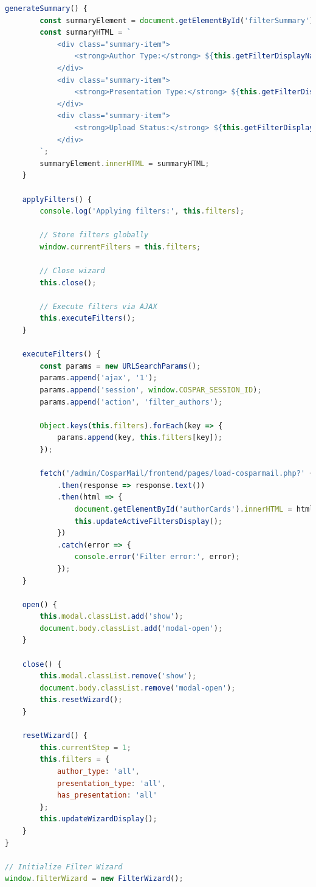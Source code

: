 \documentclass[11pt,a4paper]{article}
\begin{document}
\begin{lstlisting}[language=JavaScript, caption=Filter-Wizard Implementation]
    generateSummary() {
        const summaryElement = document.getElementById('filterSummary');
        const summaryHTML = `
            <div class="summary-item">
                <strong>Author Type:</strong> ${this.getFilterDisplayName('author_type', this.filters.author_type)}
            </div>
            <div class="summary-item">
                <strong>Presentation Type:</strong> ${this.getFilterDisplayName('presentation_type', this.filters.presentation_type)}
            </div>
            <div class="summary-item">
                <strong>Upload Status:</strong> ${this.getFilterDisplayName('has_presentation', this.filters.has_presentation)}
            </div>
        `;
        summaryElement.innerHTML = summaryHTML;
    }
    
    applyFilters() {
        console.log('Applying filters:', this.filters);
        
        // Store filters globally
        window.currentFilters = this.filters;
        
        // Close wizard
        this.close();
        
        // Execute filters via AJAX
        this.executeFilters();
    }
    
    executeFilters() {
        const params = new URLSearchParams();
        params.append('ajax', '1');
        params.append('session', window.COSPAR_SESSION_ID);
        params.append('action', 'filter_authors');
        
        Object.keys(this.filters).forEach(key => {
            params.append(key, this.filters[key]);
        });
        
        fetch('/admin/CosparMail/frontend/pages/load-cosparmail.php?' + params.toString())
            .then(response => response.text())
            .then(html => {
                document.getElementById('authorCards').innerHTML = html;
                this.updateActiveFiltersDisplay();
            })
            .catch(error => {
                console.error('Filter error:', error);
            });
    }
    
    open() {
        this.modal.classList.add('show');
        document.body.classList.add('modal-open');
    }
    
    close() {
        this.modal.classList.remove('show');
        document.body.classList.remove('modal-open');
        this.resetWizard();
    }
    
    resetWizard() {
        this.currentStep = 1;
        this.filters = {
            author_type: 'all',
            presentation_type: 'all',
            has_presentation: 'all'
        };
        this.updateWizardDisplay();
    }
}

// Initialize Filter Wizard
window.filterWizard = new FilterWizard();
\end{lstlisting}
\end{document}
